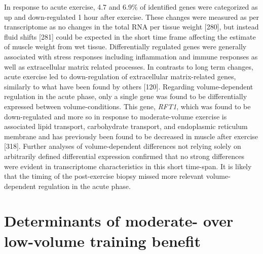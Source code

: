 \documentclass[twoside,10pt]{gihclass} %
\begin{document}
In response to acute exercise, 4.7 and 6.9\% of identified genes were categorized as up and down-regulated 1 hour after exercise.
These changes were measured as per transcriptome as no changes in the total RNA per tissue weight
{[}280{]},
but instead fluid shifts {[}281{]}
could be expected in the short time frame affecting the estimate of muscle weight from wet tissue.
Differentially regulated genes were generally associated with stress responses including inflammation and immune responses as well as extracellular matrix related processes. In contrasts to long term changes, acute exercise led to down-regulation of extracellular matrix-related genes, similarly to what have been found by others {[}120{]}.
Regarding volume-dependent regulation in the acute phase, only a single gene was found to be differentially expressed between volume-conditions. This gene, \emph{RFT1}, which was found to be down-regulated and more so in response to moderate-volume exercise is associated lipid transport, carbohydrate transport, and endoplasmic reticulum membrane and has previously been found to be decreased in muscle after exercise {[}318{]}.
Further analyses of volume-dependent differences not relying solely on arbitrarily defined differential expression confirmed that no strong differences were evident in transcriptome characteristics in this short time-span.
It is likely that the timing of the post-exercise biopsy missed more relevant volume-dependent regulation in the acute phase.

\hypertarget{determinants}{%
\section{Determinants of moderate- over low-volume training benefit}\label{determinants}}
\end{document}
